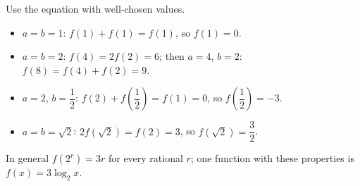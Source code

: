 Use the equation with well-chosen values.
\begin{itemize}
\item $a=b=1$: $f(1)+f(1)=f(1)$, so $f(1)=\boxed{0}$.
\item $a=b=2$: $f(4)=2f(2)=6$; then $a=4$, $b=2$: $f(8)=f(4)+f(2)=\boxed{9}$.
\item $a=2$, $b=\dfrac{1}{2}$: $f(2)+f\left(\dfrac{1}{2}\right)=f(1)=0$, so $f\left(\dfrac{1}{2}\right)=\boxed{-3}$.
\item $a=b=\sqrt2$: $2f\left(\sqrt2\right)=f(2)=3$, so $f\left(\sqrt2\right)=\boxed{\dfrac{3}{2}}$.
\end{itemize}
In general $f\left(2^r\right)=3r$ for every rational $r$; one function with these properties is $f(x)=3\log_2x$.
